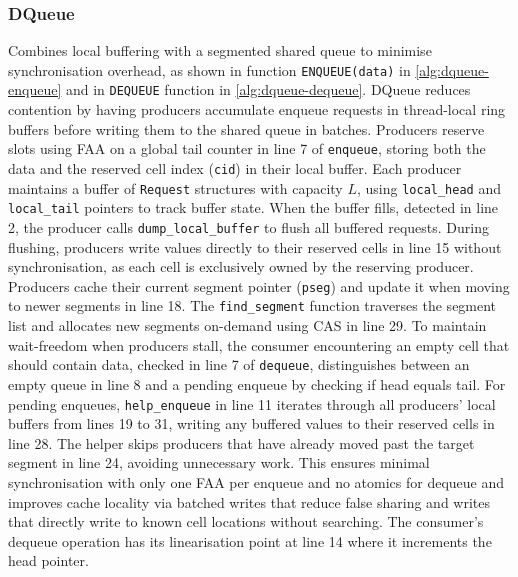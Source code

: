 \subsubsection{DQueue}
Combines local buffering with a segmented shared queue to minimise synchronisation overhead, as shown in function \texttt{ENQUEUE(data)} in \cref{alg:dqueue-enqueue} and in \texttt{DEQUEUE} function in \cref{alg:dqueue-dequeue}. DQueue reduces contention by having producers accumulate enqueue requests in thread-local ring buffers before writing them to the shared queue in batches. Producers reserve slots using \ac{FAA} on a global tail counter in line 7 of \texttt{enqueue}, storing both the data and the reserved cell index (\texttt{cid}) in their local buffer. Each producer maintains a buffer of \texttt{Request} structures with capacity $L$, using \texttt{local\_head} and \texttt{local\_tail} pointers to track buffer state. When the buffer fills, detected in line 2, the producer calls \texttt{dump\_local\_buffer} to flush all buffered requests. During flushing, producers write values directly to their reserved cells in line 15 without synchronisation, as each cell is exclusively owned by the reserving producer. Producers cache their current segment pointer (\texttt{pseg}) and update it when moving to newer segments in line 18. The \texttt{find\_segment} function traverses the segment list and allocates new segments on-demand using \ac{CAS} in line 29. To maintain wait-freedom when producers stall, the consumer encountering an empty cell that should contain data, checked in line 7 of \texttt{dequeue}, distinguishes between an empty queue in line 8 and a pending enqueue by checking if head equals tail. For pending enqueues, \texttt{help\_enqueue} in line 11 iterates through all producers' local buffers from lines 19 to 31, writing any buffered values to their reserved cells in line 28. The helper skips producers that have already moved past the target segment in line 24, avoiding unnecessary work. This ensures minimal synchronisation with only one \ac{FAA} per enqueue and no atomics for dequeue and improves cache locality via batched writes that reduce false sharing and writes that directly write to known cell locations without searching. The consumer's dequeue operation has its linearisation point at line 14 where it increments the head pointer. \cite{WangCacheCoherent}


